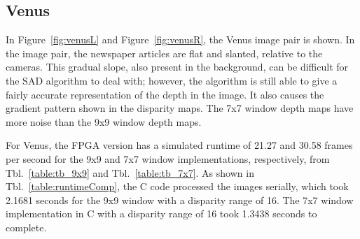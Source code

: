 \subsection{Venus}
\label{sec:venus}

In Figure~\ref{fig:venusL} and Figure~\ref{fig:venusR}, the Venus image pair is shown. In the image pair, the newspaper articles are flat and slanted, relative to the cameras. This gradual slope, also present in the background, can be difficult for the SAD algorithm to deal with; however, the algorithm is still able to give a fairly accurate representation of the depth in the image. It also causes the gradient pattern shown in the disparity maps. The 7x7 window depth maps have more noise than the 9x9 window depth maps.

For Venus, the FPGA version has a simulated runtime of 21.27 and 30.58 frames per second for the 9x9 and 7x7 window implementations, respectively, from Tbl.~\ref{table:tb_9x9} and Tbl.~\ref{table:tb_7x7}. As shown in Tbl.~\ref{table:runtimeComp}, the C code processed the images serially, which took 2.1681 seconds for the 9x9 window with a disparity range of 16. The 7x7 window implementation in C with a disparity range of 16 took 1.3438 seconds to complete.

